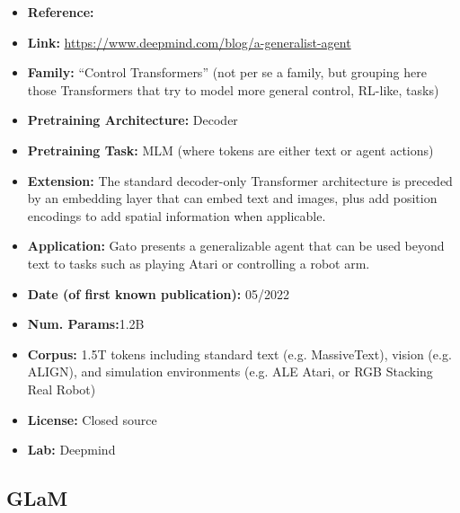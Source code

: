\documentclass{article}
\begin{document}
            \begin{itemize}
                \item \textbf{Reference:} 
                \item \textbf{Link:} \url{https://www.deepmind.com/blog/a-generalist-agent}
                \item \textbf{Family:} “Control Transformers” (not per se a family, but grouping here those Transformers that try to model more general control, RL-like, tasks) 
                \item \textbf{Pretraining Architecture:} Decoder
                \item \textbf{Pretraining Task:} MLM (where tokens are either text or agent actions)
                \item \textbf{Extension:} The standard decoder-only Transformer architecture is preceded by an embedding layer that can embed text and images, plus add position encodings to add spatial information when applicable.  
                \item \textbf{Application:} Gato presents a generalizable agent that can be used beyond text to tasks such as playing Atari or controlling a robot arm.
                \item \textbf{Date (of first known publication):} 05/2022
                \item \textbf{Num. Params:}1.2B
                \item \textbf{Corpus:} 1.5T tokens including standard text (e.g. MassiveText), vision (e.g. ALIGN), and simulation environments (e.g. ALE Atari, or RGB Stacking Real Robot)
                \item \textbf{License:} Closed source
                \item \textbf{Lab:} Deepmind
            \end{itemize}

\subsection{GLaM}
\end{document}
